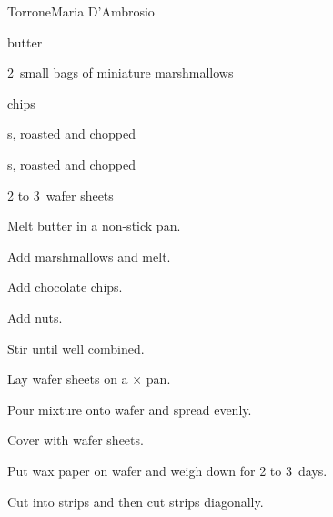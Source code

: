 \begin{recipe}{Torrone}{Maria D'Ambrosio}{}

\begin{ingredients}
\item \C{\threequarter} butter
\item 2~small bags of miniature marshmallows
\item \C{2\half}  chips
\item {} s, roasted and chopped
\item {} s, roasted and chopped
\item 2 to 3~wafer sheets
\end{ingredients}

\begin{directions}
\item Melt butter in a non-stick pan.
\item Add marshmallows and melt.
\item Add chocolate chips.
\item Add nuts.
\item Stir until well combined.
\item Lay wafer sheets on a $\times$ pan.
\item Pour mixture onto wafer and spread evenly.
\item Cover with wafer sheets.
\item Put wax paper on wafer and weigh down for 2 to 3~days.
\item Cut into strips and then cut strips diagonally.
\end{directions}

\end{recipe}
